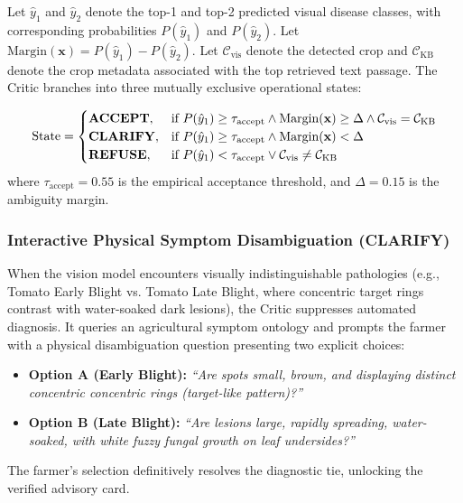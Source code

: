 \documentclass[conference]{IEEEtran}
\begin{document}
Let $\hat{y}_1$ and $\hat{y}_2$ denote the top-1 and top-2 predicted visual disease classes, with corresponding probabilities $P(\hat{y}_1)$ and $P(\hat{y}_2)$. Let $\text{Margin}(\mathbf{x}) = P(\hat{y}_1) - P(\hat{y}_2)$. Let $\mathcal{C}_{\text{vis}}$ denote the detected crop and $\mathcal{C}_{\text{KB}}$ denote the crop metadata associated with the top retrieved text passage. The Critic branches into three mutually exclusive operational states:

\begin{equation}
\text{State} = \begin{cases}
\text{\textbf{ACCEPT}}, & \text{if } P(\hat{y}_1) \ge \tau_{\text{accept}} \wedge \text{Margin}(\mathbf{x}) \ge \Delta \wedge \mathcal{C}_{\text{vis}} = \mathcal{C}_{\text{KB}} \\
\text{\textbf{CLARIFY}}, & \text{if } P(\hat{y}_1) \ge \tau_{\text{accept}} \wedge \text{Margin}(\mathbf{x}) < \Delta \\
\text{\textbf{REFUSE}}, & \text{if } P(\hat{y}_1) < \tau_{\text{accept}} \vee \mathcal{C}_{\text{vis}} \neq \mathcal{C}_{\text{KB}}
\end{cases}
\label{eq:critic}
\end{equation}
where $\tau_{\text{accept}} = 0.55$ is the empirical acceptance threshold, and $\Delta = 0.15$ is the ambiguity margin.

\subsubsection{Interactive Physical Symptom Disambiguation (CLARIFY)}
When the vision model encounters visually indistinguishable pathologies (e.g., Tomato Early Blight vs. Tomato Late Blight, where concentric target rings contrast with water-soaked dark lesions), the Critic suppresses automated diagnosis. It queries an agricultural symptom ontology and prompts the farmer with a physical disambiguation question presenting two explicit choices:
\begin{itemize}
    \item \textbf{Option A (Early Blight):} \textit{``Are spots small, brown, and displaying distinct concentric concentric rings (target-like pattern)?''}
    \item \textbf{Option B (Late Blight):} \textit{``Are lesions large, rapidly spreading, water-soaked, with white fuzzy fungal growth on leaf undersides?''}
\end{itemize}
The farmer's selection definitively resolves the diagnostic tie, unlocking the verified advisory card.
\end{document}
